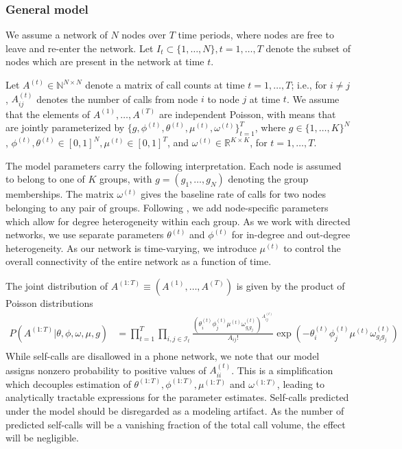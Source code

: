\documentclass{article}
\begin{document}
\subsubsection{General model}
 We assume a network of $N$ nodes over $T$ time periods, where nodes are free to leave and re-enter the network. Let $I_t \subset \{1,\ldots,N\}, t=1,\ldots,T$ denote the subset of nodes which are present in the network at time $t$.

Let $A^{(t)} \in \mathbb{N}^{N \times N}$ denote a matrix of call counts at time $t=1,\ldots,T$; i.e., for $i \neq j$, $A_{ij}^{(t)}$ denotes the number of calls from node $i$ to node $j$ at time $t$. We assume that the elements of $A^{(1)},\ldots,A^{(T)}$ are independent Poisson, with means that are jointly parameterized  by $ \{g,\phi^{(t)},\theta^{(t)},\mu^{(t)},\omega^{(t)}\}_{t=1}^T$, where $g \in \{1,\ldots,K\}^N$, $\phi^{(t)}, \theta^{(t)} \in [0,1]^N, \mu^{(t)} \in [0,1]^T$, and  $\omega^{(t)} \in \mathbb{R}^{K \times K}$, for $t=1,\ldots,T$. 

The model parameters carry the following interpretation. Each node is assumed to belong to one of $K$ groups, with $g=(g_1,\ldots,g_N)$ denoting the group memberships. The matrix $\omega^{(t)}$ gives the baseline rate of calls for two nodes belonging to any pair of groups. Following \cite{karrer2011stochastic}, we add node-specific parameters which allow for degree heterogeneity within each group. As we work with directed networks, we use separate parameters $\theta^{(t)}$ and $\phi^{(t)}$ for in-degree and out-degree heterogeneity. As our network is time-varying, we introduce $\mu^{(t)}$ to control the overall connectivity of the entire network as a function of time. 

The joint distribution of $A^{(1:T)} \equiv (A^{(1)},\ldots,A^{(T)})$ is given by the product of Poisson distributions
\begin{align*}
P(A^{(1:T)}|\theta,\phi,\omega,\mu,g) & = \prod_{t=1}^T \prod_{i, j \in \mathcal{I}_t} \frac{\left(\theta_i^{(t)} \phi_j^{(t)} \mu^{(t)} \omega_{g_i g_j}^{(t)}\right)^{A_{ij}^{(t)}}}{A_{ij}!} \exp\left(- \theta_i^{(t)} \phi_j^{(t)} \mu^{(t)} \omega_{g_i g_j}^{(t)}\right) \\
\end{align*}
While self-calls are disallowed in a phone network, we note that our model assigns nonzero probability to positive values of $A_{ii}^{(t)}$. This is a simplification which decouples estimation of $\theta^{(1:T)}, \phi^{(1:T)}, \mu^{(1:T)}$ and $\omega^{(1:T)}$, leading to analytically tractable expressions for the parameter estimates. Self-calls predicted under the model should be disregarded as a modeling artifact. As the number of predicted self-calls will be a vanishing fraction of the total call volume, the effect will be negligible.
\end{document}
